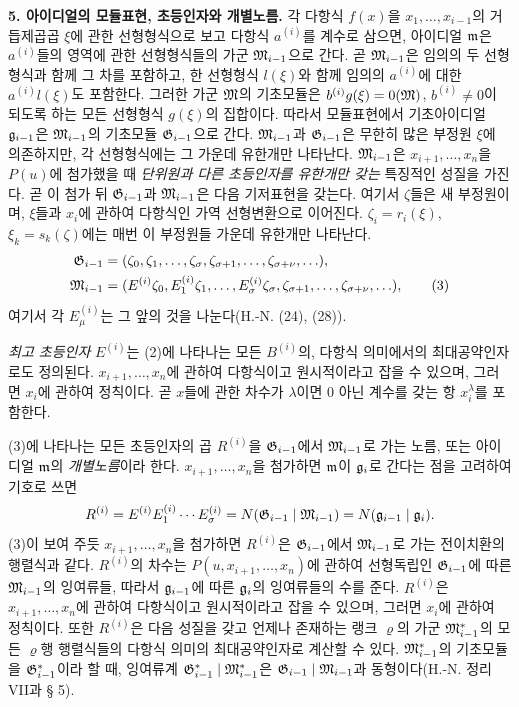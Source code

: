 \textbf{5. 아이디얼의 모듈표현, 초등인자와 개별노름.} 각 다항식 \(f(x)\)을 \(x_1,\ldots,x_{i-1}\)의 거듭제곱곱 \(\xi\)에 관한 선형형식으로 보고 다항식 \(a^{(i)}\)를 계수로 삼으면, 아이디얼 \(\mathfrak m\)은 \(a^{(i)}\)들의 영역에 관한 선형형식들의 가군 \(\mathfrak M_{i-1}\)으로 간다. 곧 \(\mathfrak M_{i-1}\)은 임의의 두 선형형식과 함께 그 차를 포함하고, 한 선형형식 \(l(\xi)\)와 함께 임의의 \(a^{(i)}\)에 대한 \(a^{(i)}l(\xi)\)도 포함한다. 그러한 가군 \(\mathfrak M\)의 기초모듈은 \(b^{(i)}g(\xi)=0(\mathfrak M)\), \(b^{(i)}\ne0\)이 되도록 하는 모든 선형형식 \(g(\xi)\)의 집합이다. 따라서 모듈표현에서 기초아이디얼 \(\mathfrak g_{i-1}\)은 \(\mathfrak M_{i-1}\)의 기초모듈 \(\mathfrak G_{i-1}\)으로 간다. \(\mathfrak M_{i-1}\)과 \(\mathfrak G_{i-1}\)은 무한히 많은 부정원 \(\xi\)에 의존하지만, 각 선형형식에는 그 가운데 유한개만 나타난다. \(\mathfrak M_{i-1}\)은 \(x_{i+1},\ldots,x_n\)을 \(P(u)\)에 첨가했을 때 \emph{단위원과 다른 초등인자를 유한개만 갖는} 특징적인 성질을 가진다. 곧 이 첨가 뒤 \(\mathfrak G_{i-1}\)과 \(\mathfrak M_{i-1}\)은 다음 기저표현을 갖는다. 여기서 \(\zeta\)들은 새 부정원이며, \(\xi\)들과 \(x_i\)에 관하여 다항식인 가역 선형변환으로 이어진다. \(\zeta_i=r_i(\xi)\), \(\xi_k=s_k(\zeta)\)에는 매번 이 부정원들 가운데 유한개만 나타난다.
\begin{align}
\mathfrak G_{i-1}&=(\zeta_0,\zeta_1,\ldots,\zeta_\sigma,\zeta_{\sigma+1},\ldots,\zeta_{\sigma+\nu},\ldots), \notag\\
\mathfrak M_{i-1}&=(E^{(i)}\zeta_0,E_1^{(i)}\zeta_1,\ldots,E_\sigma^{(i)}\zeta_\sigma,
\zeta_{\sigma+1},\ldots,\zeta_{\sigma+\nu},\ldots), \tag{3}
\end{align}
여기서 각 \(E_\mu^{(i)}\)는 그 앞의 것을 나눈다(H.-N. (24), (28)).

\emph{최고 초등인자} \(E^{(i)}\)는 (2)에 나타나는 모든 \(B^{(i)}\)의, 다항식 의미에서의 최대공약인자로도 정의된다. \(x_{i+1},\ldots,x_n\)에 관하여 다항식이고 원시적이라고 잡을 수 있으며, 그러면 \(x_i\)에 관하여 정칙이다. 곧 \(x\)들에 관한 차수가 \(\lambda\)이면 0 아닌 계수를 갖는 항 \(x_i^\lambda\)를 포함한다.

(3)에 나타나는 모든 초등인자의 곱 \(R^{(i)}\)을 \(\mathfrak G_{i-1}\)에서 \(\mathfrak M_{i-1}\)로 가는 노름, 또는 아이디얼 \(\mathfrak m\)의 \emph{개별노름}이라 한다. \(x_{i+1},\ldots,x_n\)을 첨가하면 \(\mathfrak m\)이 \(\mathfrak g_i\)로 간다는 점을 고려하여 기호로 쓰면
\begin{equation*}
 R^{(i)}=E^{(i)}E_1^{(i)}\cdots E_\sigma^{(i)}
 =N(\mathfrak G_{i-1}\mid\mathfrak M_{i-1})=N(\mathfrak g_{i-1}\mid\mathfrak g_i).
\end{equation*}
(3)이 보여 주듯 \(x_{i+1},\ldots,x_n\)을 첨가하면 \(R^{(i)}\)은 \(\mathfrak G_{i-1}\)에서 \(\mathfrak M_{i-1}\)로 가는 전이치환의 행렬식과 같다. \(R^{(i)}\)의 차수는 \(P(u,x_{i+1},\ldots,x_n)\)에 관하여 선형독립인 \(\mathfrak G_{i-1}\)에 따른 \(\mathfrak M_{i-1}\)의 잉여류들, 따라서 \(\mathfrak g_{i-1}\)에 따른 \(\mathfrak g_i\)의 잉여류들의 수를 준다. \(R^{(i)}\)은 \(x_{i+1},\ldots,x_n\)에 관하여 다항식이고 원시적이라고 잡을 수 있으며, 그러면 \(x_i\)에 관하여 정칙이다. 또한 \(R^{(i)}\)은 다음 성질을 갖고 언제나 존재하는 랭크 \(\varrho\)의 가군 \(\mathfrak M^*_{i-1}\)의 모든 \(\varrho\)행 행렬식들의 다항식 의미의 최대공약인자로 계산할 수 있다. \(\mathfrak M^*_{i-1}\)의 기초모듈을 \(\mathfrak G^*_{i-1}\)이라 할 때, 잉여류계 \(\mathfrak G^*_{i-1}\mid\mathfrak M^*_{i-1}\)은 \(\mathfrak G_{i-1}\mid\mathfrak M_{i-1}\)과 동형이다(H.-N. 정리 VII과 § 5).

